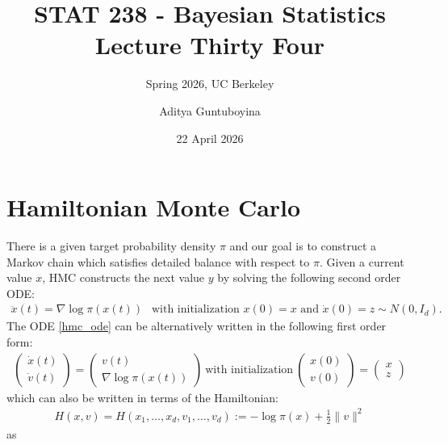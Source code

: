 \documentclass{scrartcl}
\begin{document}
\title{STAT 238 - Bayesian Statistics  \\
  Lecture Thirty Four} 
\subtitle{Spring 2026, UC Berkeley}

\author{Aditya Guntuboyina}


\date{22 April 2026}

\maketitle

\section{Hamiltonian Monte Carlo}

There is a given target probability density $\pi$ and our goal is to
construct a Markov chain which satisfies detailed balance with respect
to $\pi$. Given a current value $x$, HMC constructs the next value $y$
by solving the following second order ODE:
\begin{align}\label{hmc_ode}
  \ddot{x}(t) = \nabla \log \pi(x(t)) ~~ \text{ with initialization
  $x(0) = x$ and $\dot{x}(0) = z \sim N(0, I_d)$}. 
\end{align}
The ODE \eqref{hmc_ode} can be alternatively written in the following
first order form:
\begin{align}\label{hmc_firstorder}
  \begin{pmatrix}
    \dot{x}(t) \\ \dot{v}(t)
  \end{pmatrix} =
  \begin{pmatrix}
    v(t) \\ \nabla \log \pi(x(t)) 
  \end{pmatrix} ~\text{with initialization}~
  \begin{pmatrix}
    x(0) \\ v(0)
  \end{pmatrix} =
  \begin{pmatrix}
    x \\ z
  \end{pmatrix}
\end{align}
which can also be written in terms of the Hamiltonian: 
\begin{align}\label{hamiltonian}
  H(x, v) = H(x_1, \dots, x_d, v_1, \dots, v_d) := -\log \pi(x) +
  \frac{1}{2}\|v\|^2 
\end{align}
as 
\end{document}

